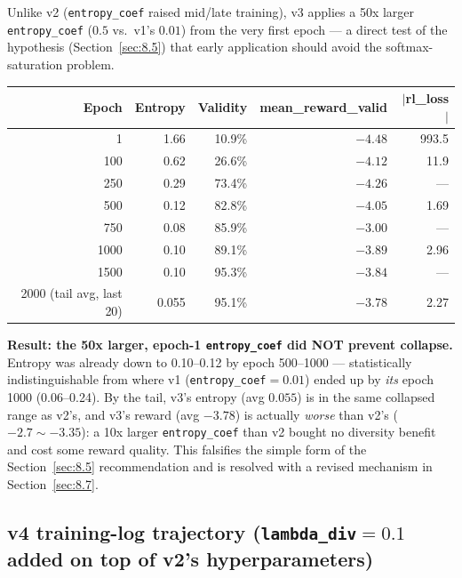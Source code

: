 \documentclass[11pt]{article}
\newcommand{\code}[1]{\texttt{#1}}
\begin{document}
Unlike v2 (\code{entropy\_coef} raised mid/late training), v3 applies a 50x larger \code{entropy\_coef} ($0.5$ vs.\ v1's $0.01$) from the very first epoch --- a direct test of the hypothesis (Section~\ref{sec:8.5}) that early application should avoid the softmax-saturation problem.

\begin{center}
\begin{tabular}{@{}r r r r r@{}}
\toprule
\textbf{Epoch} & \textbf{Entropy} & \textbf{Validity} & \textbf{mean\_reward\_valid} & \textbf{$|$rl\_loss$|$} \\
\midrule
1 & 1.66 & 10.9\% & $-4.48$ & 993.5 \\
100 & 0.62 & 26.6\% & $-4.12$ & 11.9 \\
250 & 0.29 & 73.4\% & $-4.26$ & --- \\
500 & 0.12 & 82.8\% & $-4.05$ & 1.69 \\
750 & 0.08 & 85.9\% & $-3.00$ & --- \\
1000 & 0.10 & 89.1\% & $-3.89$ & 2.96 \\
1500 & 0.10 & 95.3\% & $-3.84$ & --- \\
2000 (tail avg, last 20) & 0.055 & 95.1\% & $-3.78$ & 2.27 \\
\bottomrule
\end{tabular}
\end{center}

\textbf{Result: the 50x larger, epoch-1 \code{entropy\_coef} did NOT prevent collapse.} Entropy was already down to 0.10--0.12 by epoch 500--1000 --- statistically indistinguishable from where v1 (\code{entropy\_coef}$=0.01$) ended up by \emph{its} epoch 1000 (0.06--0.24). By the tail, v3's entropy (avg $0.055$) is in the same collapsed range as v2's, and v3's reward (avg $-3.78$) is actually \emph{worse} than v2's ($-2.7\sim-3.35$): a 10x larger \code{entropy\_coef} than v2 bought no diversity benefit and cost some reward quality. This falsifies the simple form of the Section~\ref{sec:8.5} recommendation and is resolved with a revised mechanism in Section~\ref{sec:8.7}.

\subsection{v4 training-log trajectory (\code{lambda\_div}$=0.1$ added on top of v2's hyperparameters)}
\end{document}
